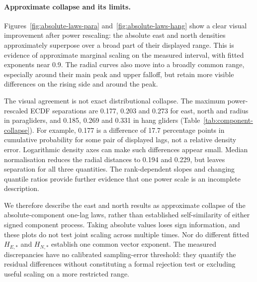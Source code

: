 \paragraph{Approximate collapse and its limits.}
Figures~\ref{fig:absolute-laws-para} and~\ref{fig:absolute-laws-hang} show a
clear visual improvement after power rescaling: the absolute east and north
densities approximately superpose over a broad part of their displayed range.
This is evidence of approximate marginal scaling on the measured interval,
with fitted exponents near 0.9. The radial curves also move into a broadly
common range, especially around their main peak and upper falloff, but retain
more visible differences on the rising side and around the peak.

The visual agreement is not exact distributional collapse. The maximum
power-rescaled ECDF separations are 0.177, 0.203 and 0.273 for east, north and
radius in paragliders, and 0.185, 0.269 and 0.331 in hang gliders
(Table~\ref{tab:component-collapse}). For example, 0.177 is a difference of
17.7 percentage points in cumulative probability for some pair of displayed
lags, not a relative density error. Logarithmic density axes can make such
differences appear small. Median normalisation reduces the radial distances
to 0.194 and 0.229, but leaves separation for all three quantities. The
rank-dependent slopes and changing quantile ratios provide further evidence
that one power scale is an incomplete description.

We therefore describe the east and north results as approximate collapse of
the absolute-component one-lag laws, rather than established self-similarity
of either signed component process. Taking absolute values loses sign
information, and these plots do not test joint scaling across multiple times.
Nor do different fitted $H_{E,*}$ and $H_{N,*}$ establish one common vector
exponent. The measured discrepancies have no calibrated sampling-error
threshold: they quantify the residual differences without constituting a
formal rejection test or excluding useful scaling on a more restricted range.

